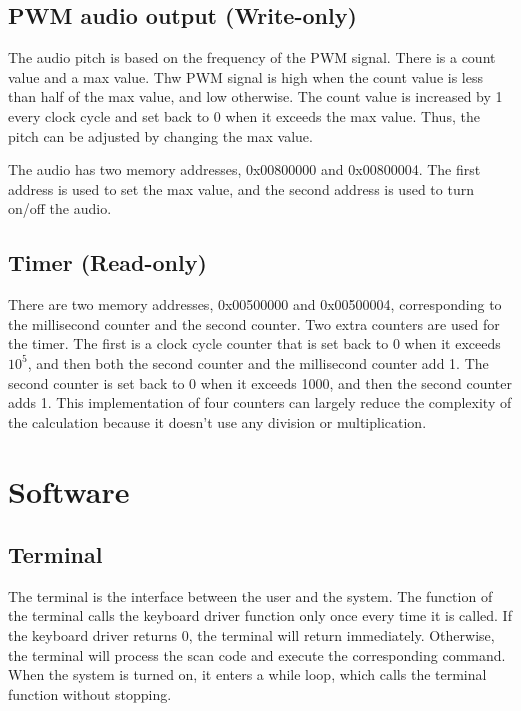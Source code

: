\documentclass[
	a4paper, %
	11pt, %
]{CSUniSchoolLabReport}
\begin{document}
\subsection{PWM audio output (Write-only)}
The audio pitch is based on the frequency of the PWM signal. There is a count value and a max value. Thw PWM signal is high when the count value is less than half of the max value, and low otherwise. The count value is increased by 1 every clock cycle and set back to 0 when it exceeds the max value. Thus, the pitch can be adjusted by changing the max value.

The audio has two memory addresses, 0x00800000 and 0x00800004. The first address is used to set the max value, and the second address is used to turn on/off the audio.

\subsection{Timer (Read-only)}
There are two memory addresses, 0x00500000 and 0x00500004, corresponding to the millisecond counter and the second counter. Two extra counters are used for the timer. The first is a clock cycle counter that is set back to 0 when it exceeds $10^5$, and then both the second counter and the millisecond counter add 1. The second counter is set back to 0 when it exceeds 1000, and then the second counter adds 1. This implementation of four counters can largely reduce the complexity of the calculation because it doesn't use any division or multiplication.

\section{Software}
\subsection{Terminal}
The terminal is the interface between the user and the system. The function of the terminal calls the keyboard driver function only once every time it is called. If the keyboard driver returns 0, the terminal will return immediately. Otherwise, the terminal will process the scan code and execute the corresponding command. When the system is turned on, it enters a while loop, which calls the terminal function without stopping.
\end{document}
